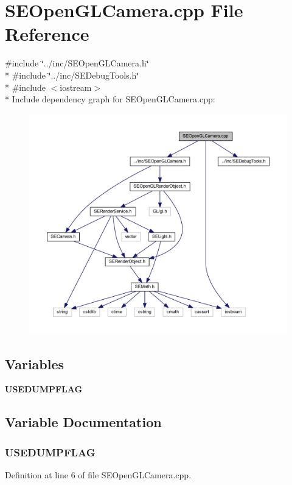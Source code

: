 \section{S\+E\+Open\+G\+L\+Camera.\+cpp File Reference}
\label{_s_e_open_g_l_camera_8cpp}
{\ttfamily \#include \char`\"{}../inc/\+S\+E\+Open\+G\+L\+Camera.\+h\char`\"{}}\\*
{\ttfamily \#include \char`\"{}../inc/\+S\+E\+Debug\+Tools.\+h\char`\"{}}\\*
{\ttfamily \#include $<$iostream$>$}\\*
Include dependency graph for S\+E\+Open\+G\+L\+Camera.\+cpp\+:
\nopagebreak
\begin{figure}[H]
\begin{center}
\leavevmode
\includegraphics[width=350pt]{_s_e_open_g_l_camera_8cpp__incl}
\end{center}
\end{figure}
\subsection*{Variables}
\begin{DoxyCompactItemize}
\item 
{\bf U\+S\+E\+D\+U\+M\+P\+F\+L\+A\+G}
\end{DoxyCompactItemize}


\subsection{Variable Documentation}
\subsubsection[{U\+S\+E\+D\+U\+M\+P\+F\+L\+A\+G}]{\setlength{\rightskip}{0pt plus 5cm}U\+S\+E\+D\+U\+M\+P\+F\+L\+A\+G}\label{_s_e_open_g_l_camera_8cpp_adf706a38197b60bc3bf6b16557554414}


Definition at line 6 of file S\+E\+Open\+G\+L\+Camera.\+cpp.

